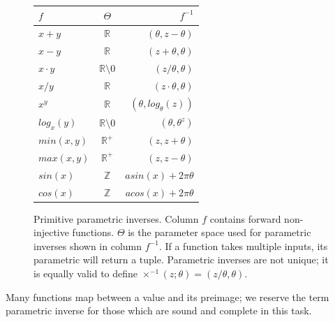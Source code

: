 \documentclass{sciposter}
\theoremstyle{definition} %
\newcommand{\card}[1]{\left\vert {#1} \right\vert}
\begin{document}
\begin{multicols}{3}


\begin{figure}
\begin{center}
         \begin{tabular}{ l | c | r }
  	$f$ & $\Theta$ & $f^{-1}$ \\
    \hline
$x+y$ & $\mathbb{R}$ & $(\theta, z - \theta)$ \\
$x-y$ & $\mathbb{R}$ & $(z + \theta, \theta)$ \\
$x\cdot y$ & $\mathbb{R} \setminus 0$ & $(z / \theta, \theta)$ \\
$x / y$ & $\mathbb{R}$ & $(z \cdot \theta, \theta)$ \\
$x^y$ & $\mathbb{R}$ & $(\theta, log_\theta(z))$ \\
$log_x(y)$ & $\mathbb{R} \setminus 0$ & $(\theta, \theta^z)$ \\
$min(x,y)$ & $\mathbb{R}^+$ & $(z, z + \theta)$ \\
$max(x,y)$ & $\mathbb{R}^+$ & $(z, z - \theta)$ \\
$sin(x)$ & $\mathbb{Z}$ & $asin(x) + 2\pi \theta$ \\
$cos(x)$ & $\mathbb{Z}$ & $acos(x) + 2\pi \theta$ \\
    \hline
\end{tabular}
\end{center}
\caption{Primitive parametric inverses.  Column $f$ contains forward non-injective functions. $\Theta$ is the parameter space used for parametric inverses shown in column $f^{-1}$. 
If a function takes multiple inputs, its parametric will return a tuple.
Parametric inverses are not unique; it is equally valid to define $\times^{-1}(z; \theta) = (z/\theta, \theta)$. }\label{tab:inverses}
\end{figure}



Many functions map between a value and its preimage; we reserve the term parametric inverse for those which are sound and complete in this task.


\end{multicols}
\end{document}
